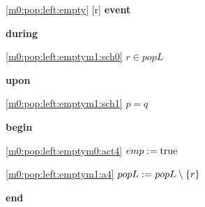 \noindent \ref{m0:pop:left:empty} [r] \textbf{event}
\begin{block}
  \item   \textbf{during}
  \begin{block}
  \item[ \eqref{m0:pop:left:emptym1:sch0} ]$r \in popL $ %
  \end{block}
  \item   \textbf{upon}
  \begin{block}
  \item[ \eqref{m0:pop:left:emptym1:sch1} ]$p = q $ %
  \end{block}
  \item   \textbf{begin}
  \begin{block}
  \item[ \eqref{m0:pop:left:emptym0:act4} ]$emp \mathrel{:\mkern1mu=} \text{true} $ %
  \item[ \eqref{m0:pop:left:emptym1:a4} ]$popL \mathrel{:\mkern1mu=} popL \setminus \{ r \} $ %
  \end{block}
  \item   \textbf{end} \\
\end{block}
